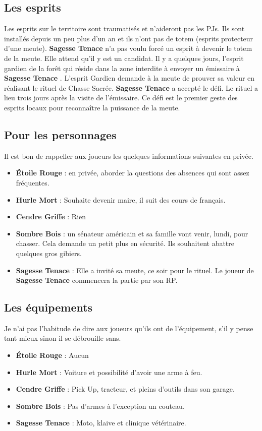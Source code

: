 \documentclass[oneside,12pt]{book}
\newcommand{\Lynn}{\textbf{Étoile Rouge} }
\newcommand{\Jessica}{\textbf{Sagesse Tenace} }
\newcommand{\Luke}{\textbf{Cendre Griffe} }
\newcommand{\Peter}{\textbf{Hurle Mort} }
\newcommand{\Leonard}{\textbf{Sombre Bois} }
\begin{document}
\begin{flushleft}
\clearpage

\subsection{Les esprits}
Les esprits sur le territoire sont traumatisés et n'aideront pas les PJs. Ils sont installés depuis un peu plus d'un an et ils n'ont pas de totem (esprits protecteur d'une meute). 
\Jessica n'a pas voulu forcé un esprit à devenir le totem de la meute. Elle attend qu'il y est un candidat. 
Il y a quelques jours, l'esprit gardien de la forêt qui réside dans la zone interdite à envoyer un émissaire à \Jessica. 
L'esprit Gardien demande à la meute de prouver sa valeur en réalisant le rituel de Chasse Sacrée. 
\Jessica a accepté le défi. Le rituel a lieu trois jours après la visite de l'émissaire. Ce défi est le premier geste des esprits locaux pour reconnaître la puissance de la meute.

\subsection{Pour les personnages}
Il est bon de rappeller aux joueurs les quelques informations suivantes en privée.
\begin{itemize}
\item \Lynn : en privée, aborder la questions des absences qui sont assez fréquentes.
\item \Peter : Souhaite devenir maire, il suit des cours de français.
\item \Luke : Rien
\item \Leonard : un sénateur américain et sa famille vont venir, lundi, pour chasser. Cela demande un petit plus en sécurité. Ils souhaitent abattre quelques gros gibiers. 
\item \Jessica : Elle a invité sa meute, ce soir pour le rituel. Le joueur de \Jessica commencera la partie par son RP. 
\end{itemize}

\subsection{Les équipements}
Je n'ai pas l'habitude de dire aux joueurs qu'ils ont de l'équipement, s'il y pense tant mieux sinon il se débrouille sans.
\begin{itemize}
\item \Lynn : Aucun
\item \Peter : Voiture et possibilité d'avoir une arme à feu.
\item \Luke : Pick Up, tracteur, et pleins d'outils dans son garage.
\item \Leonard : Pas d'armes à l'exception un couteau.
\item \Jessica : Moto, klaive et clinique vétérinaire. 
\end{itemize}


\end{flushleft}
\end{document}
